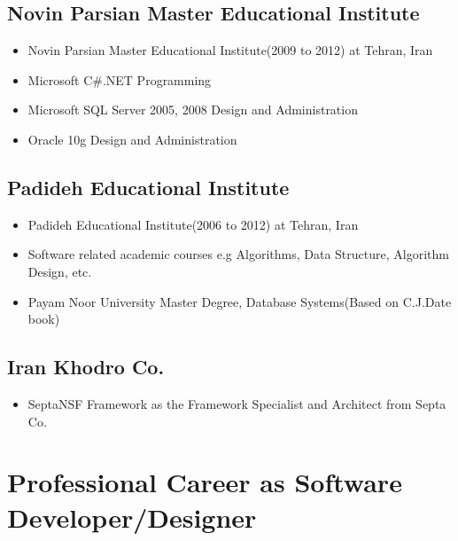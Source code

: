 \documentclass[12pt,a4paper]{article}
\begin{document}
	\subsection{Novin Parsian Master Educational Institute}
		\begin{itemize}
			\item Novin Parsian Master Educational Institute(2009 to 2012) at Tehran, Iran
			\item Microsoft C\#.NET Programming
			\item Microsoft SQL Server 2005, 2008 Design and Administration
			\item Oracle 10g Design and Administration
		\end{itemize}
	\subsection{Padideh Educational Institute}
		\begin{itemize}
			\item Padideh Educational Institute(2006 to 2012) at Tehran, Iran
			\item Software related academic courses e.g Algorithms, Data Structure, Algorithm Design, etc.
			\item Payam Noor University Master Degree, Database Systems(Based on C.J.Date book)
		\end{itemize}
	\subsection{Iran Khodro Co.}
		\begin{itemize}
			\item SeptaNSF Framework as the Framework Specialist and Architect from Septa Co.
		\end{itemize}			
\section{Professional Career as Software Developer/Designer}
\end{document}
